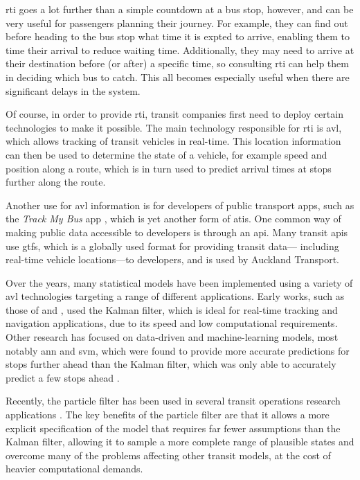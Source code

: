 \documentclass[12pt,a4paper]{article}
\newcommand{\kf}{Kalman filter}
\newcommand{\pf}{particle filter}
\begin{document}
\gls{rti} goes a lot further than a simple countdown at a bus stop, however,
and can be very useful for passengers planning their journey.
For example, they can find out before heading to the bus stop what time it is expted to arrive,
enabling them to time their arrival to reduce waiting time.
Additionally, they may need to arrive at their destination before (or after) a specific time,
so consulting \gls{rti} can help them in deciding which bus to catch.
This all becomes especially useful when there are significant delays in the system.


Of course, in order to provide \gls{rti},
transit companies first need to deploy certain technologies to make it possible.
The main technology responsible for \gls{rti} is \gls{avl},
which allows tracking of transit vehicles in real-time.
This location information can then be used to determine the state of a vehicle,
for example speed and position along a route,
which is in turn used to predict arrival times at stops further along the route.


Another use for \gls{avl} information is for developers of public transport apps,
such as the \emph{Track My Bus} app \citep{trackmybus},
which is yet another form of \gls{atis}.
One common way of making public data accessible to developers is through an \gls{api}.
Many transit \glspl{api} use \gls{gtfs}, 
which is a globally used format for providing transit data---%
including real-time vehicle locations---to developers,
and is used by Auckland Transport.


Over the years, many statistical models have been implemented using a variety of \gls{avl} technologies
targeting a range of different applications.
Early works, such as those of \cite{wall-dailey:1999} and \cite{dailey:2001},
used the \kf{}, which is ideal for real-time tracking and navigation applications,
due to its speed and low computational requirements.
Other research has focused on data-driven and machine-learning models,
most notably \gls{ann} and \gls{svm},
which were found to provide more accurate predictions for stops further ahead
than the \kf{}, which was only able to accurately predict a few stops ahead
\citep{chang-etal:2010}.


Recently, the \pf{} has been used in several transit operations research applications
\citep{chen-rakha:2014,hans-etal:2015}.
The key benefits of the \pf{} are that it allows a more explicit specification of the model
that requires far fewer assumptions than the \kf{},
allowing it to sample a more complete range of plausible states and
overcome many of the problems affecting other transit models,
at the cost of heavier computational demands.
\end{document}
